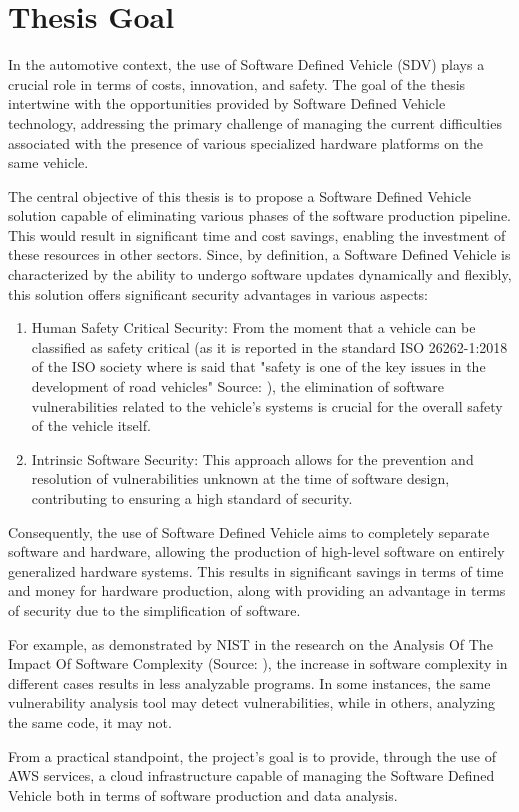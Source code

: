 \section{Thesis Goal}
In the automotive context, the use of Software Defined Vehicle (SDV) plays a crucial role in terms of costs, innovation, and safety. The goal of the thesis intertwine with the opportunities provided by Software Defined Vehicle technology, addressing the primary challenge of managing the current difficulties associated with the presence of various specialized hardware platforms on the same vehicle.

The central objective of this thesis is to propose a Software Defined Vehicle solution capable of eliminating various phases of the software production pipeline. This would result in significant time and cost savings, enabling the investment of these resources in other sectors. Since, by definition, a Software Defined Vehicle is characterized by the ability to undergo software updates dynamically and flexibly, this solution offers significant security advantages in various aspects:
\begin{enumerate}
  \item Human Safety Critical Security: From the moment that a vehicle can be classified as safety critical (as it is reported in the standard ISO 26262-1:2018 of the ISO society where is said that "safety is one of the key issues in the development of road vehicles"  Source: \cite{ISO26262}), the elimination of software vulnerabilities related to the vehicle's systems is crucial for the overall safety of the vehicle itself.  
  \item Intrinsic Software Security: This approach allows for the prevention and resolution of vulnerabilities unknown at the time of software design, contributing to ensuring a high standard of security.
\end{enumerate}

Consequently, the use of Software Defined Vehicle aims to completely separate software and hardware, allowing the production of high-level software on entirely generalized hardware systems. This results in significant savings in terms of time and money for hardware production, along with providing an advantage in terms of security due to the simplification of software.

For example, as demonstrated by NIST in the research on the Analysis Of The Impact Of Software Complexity (Source: \cite{NISTCodeComplexity}), the increase in software complexity in different cases results in less analyzable programs. In some instances, the same vulnerability analysis tool may detect vulnerabilities, while in others, analyzing the same code, it may not. 

From a practical standpoint, the project's goal is to provide, through the use of AWS services, a cloud infrastructure capable of managing the Software Defined Vehicle both in terms of software production and data analysis.